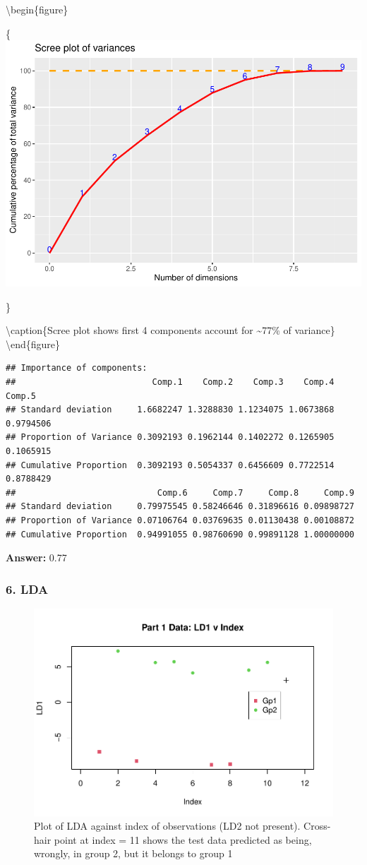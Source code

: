 \documentclass[
  8pt,
]{article}
\begin{document}
\textbackslash begin\{figure\}

\{\centering \includegraphics[width=0.65\linewidth,height=0.65\textheight]{Report_files/figure-latex/1.5-1}

\}

\textbackslash caption\{Scree plot shows first 4 components account for
\textasciitilde77\% of variance\}\label{fig:1.5}
\textbackslash end\{figure\}

\begin{verbatim}
## Importance of components:
##                           Comp.1    Comp.2    Comp.3    Comp.4    Comp.5
## Standard deviation     1.6682247 1.3288830 1.1234075 1.0673868 0.9794506
## Proportion of Variance 0.3092193 0.1962144 0.1402272 0.1265905 0.1065915
## Cumulative Proportion  0.3092193 0.5054337 0.6456609 0.7722514 0.8788429
##                            Comp.6     Comp.7     Comp.8     Comp.9
## Standard deviation     0.79975545 0.58246646 0.31896616 0.09898727
## Proportion of Variance 0.07106764 0.03769635 0.01130438 0.00108872
## Cumulative Proportion  0.94991055 0.98760690 0.99891128 1.00000000
\end{verbatim}

\textbf{Answer: }0.77

\hypertarget{lda}{%
\subsubsection{6. LDA}\label{lda}}

\begin{figure}

{\centering \includegraphics[width=0.65\linewidth,height=0.65\textheight]{Report_files/figure-latex/1.6-1} 

}

\caption{Plot of LDA against index of observations (LD2 not present). Cross-hair point at index = 11 shows the test data predicted as being, wrongly, in group 2, but it belongs to group 1}\label{fig:1.6}
\end{figure}
\end{document}
